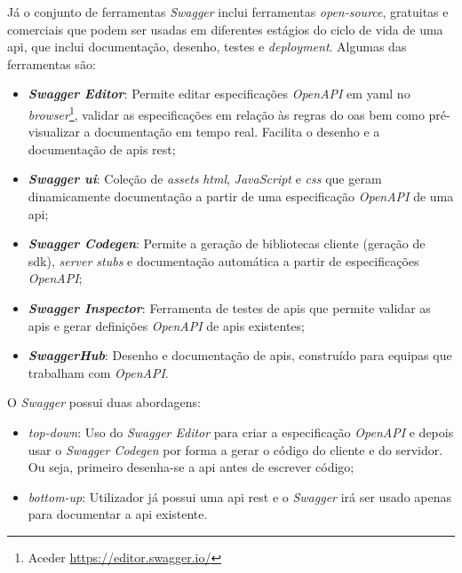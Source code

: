Já o conjunto de ferramentas \textit{Swagger} inclui ferramentas \textit{open-source}, gratuitas e comerciais 
que podem ser usadas em diferentes estágios do ciclo de vida de uma \acrshort{api}, que inclui documentação, 
desenho, testes e \textit{deployment}. Algumas das ferramentas são:~\cite{swaggerVSoas}
\begin{itemize}
    \item \textbf{\textit{Swagger Editor}}: Permite editar especificações \textit{OpenAPI} em 
    \acrshort{yaml} no \textit{browser}\footnote{Aceder \url{https://editor.swagger.io/}}, 
    validar as especificações em relação às regras do \acrshort{oas} bem como pré-visualizar 
    a documentação em tempo real. Facilita o desenho e a documentação de \acrshort{api}s \acrshort{rest};

    \item \textbf{\textit{Swagger \acrshort{ui}}}: Coleção de \textit{assets} \textit{\acrshort{html}}, 
    \textit{JavaScript} e \textit{\acrshort{css}} que geram dinamicamente documentação a partir de uma 
    especificação \textit{OpenAPI} de uma \acrshort{api};

    \item \textbf{\textit{Swagger Codegen}}: Permite a geração de bibliotecas cliente (geração de \acrshort{sdk}), 
    \textit{server stubs} e documentação automática a partir de especificações \textit{OpenAPI};

    \item \textbf{\textit{Swagger Inspector}}: Ferramenta de testes de \acrshort{api}s que permite validar 
    as \acrshort{api}s e gerar definições \textit{OpenAPI} de \acrshort{api}s existentes;

    \item \textbf{\textit{SwaggerHub}}: Desenho e documentação de \acrshort{api}s, construído para equipas que 
    trabalham com \textit{OpenAPI}.
\end{itemize}

O \textit{Swagger} possui duas abordagens:~\cite{swaggerNode}
\begin{itemize}
    \item \textit{top-down}: Uso do \textit{Swagger Editor} para criar a especificação \textit{OpenAPI} e 
    depois usar o \textit{Swagger Codegen} por forma a gerar o código do cliente e do servidor. Ou seja, 
    primeiro desenha-se a \acrshort{api} antes de escrever código;

    \item \textit{bottom-up}: Utilizador já possui uma \acrshort{api} \acrshort{rest} e o \textit{Swagger} irá 
    ser usado apenas para documentar a \acrshort{api} existente.
\end{itemize}

